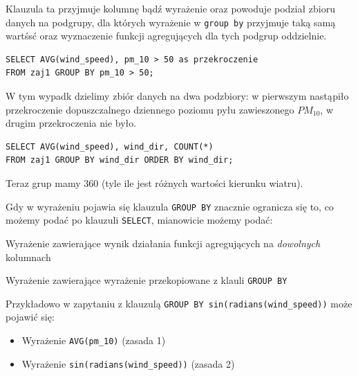 \documentclass[a4paper]{article}
\begin{document}
Klauzula ta przyjmuje kolumnę bądź wyrażenie oraz powoduje podział
zbioru danych na podgrupy, dla których wyrażenie w \texttt{group by} przyjmuje
taką samą wartśsć oraz wyznaczenie funkcji agregujących dla tych
podgrup oddzielnie.

\begin{verbatim}
SELECT AVG(wind_speed), pm_10 > 50 as przekroczenie
FROM zaj1 GROUP BY pm_10 > 50;
\end{verbatim}


W tym wypadk dzielimy zbiór danych na dwa podzbiory: w pierwszym
nastąpiło przekroczenie dopuszczalnego dziennego poziomu pyłu zawieszonego
$PM_{10}$, w drugim przekroczenia nie było.

\begin{verbatim}
SELECT AVG(wind_speed), wind_dir, COUNT(*)
FROM zaj1 GROUP BY wind_dir ORDER BY wind_dir;
\end{verbatim}


Teraz grup mamy 360 (tyle ile jest różnych wartości kierunku wiatru).

Gdy w wyrażeniu pojawia się klauzula \texttt{GROUP BY} znacznie ogranicza
się to, co możemy podać po klauzuli \texttt{SELECT}, mianowicie możemy podać:
\begin{list}{.}
{
\setlength{\rightmargin}{\leftmargin}
}

\item Wyrażenie zawierające wynik działania funkcji agregujących na
\emph{dowolnych} kolumnach

\item Wyrażenie zawierające wyrażenie przekopiowane z klauli \texttt{GROUP BY}
\end{list}

Przykładowo w zapytaniu z klauzulą \texttt{GROUP BY sin(radians(wind\_speed))}
może pojawić się:
%
\begin{itemize}

\item Wyrażenie \texttt{AVG(pm\_10)} (zasada 1)

\item Wyrażenie \texttt{sin(radians(wind\_speed))} (zasada 2)

\end{itemize}
\end{document}
